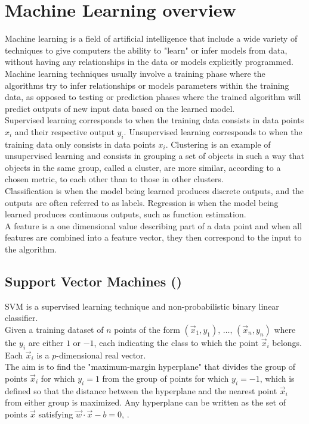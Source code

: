 \documentclass{kththesis}
\begin{document}
\section{Machine Learning overview}
Machine learning is a field of artificial intelligence that include a wide variety of techniques to give computers the ability to "learn" or infer models from data, without having any relationships in the data or models explicitly programmed. Machine learning techniques usually involve a training phase where the algorithms try to infer relationships or models parameters within the training data, as opposed to testing or prediction phases where the trained algorithm will predict outputs of new input data based on the learned model. \\
Supervised learning  corresponds to when the training data consists in data points $x_i$ and their respective output $y_i$. Unsupervised learning corresponds to when the training data only consists in data points $x_i$. Clustering is an example of unsupervised learning and consists in grouping a set of objects in such a way that objects in the same group, called a cluster, are more similar, according to a chosen metric, to each other than to those in other clusters.\\
Classification is when the model being learned produces discrete outputs, and the outputs are often referred to as labels. Regression is when the model being learned produces  continuous outputs, such as function estimation. \\
A feature is a one dimensional value describing part of a data point and when all features are combined into a feature vector, they then correspond to the input to the algorithm. 
\subsection{Support Vector Machines (\textcite{libsvm})} 
SVM is a supervised learning technique and non-probabilistic binary linear classifier. \\
Given a training dataset of $n$ points of the form
$(\vec{x}_{1},y_{1}),\,\ldots ,\,(\vec{x}_{n},y_{n})$ 
where the $y_{i} $ are either $1$ or $-1$, each indicating the class to which the point  $\vec {x}_{i}$ belongs. Each $\vec {x}_{i}$ is a $p$-dimensional real vector. \\
The aim is to find the "maximum-margin hyperplane" that divides the group of points $\vec {x}_{i}$  for which $y_{i}=1$ from the group of points for which $y_{i}=-1$, which is defined so that the distance between the hyperplane and the nearest point $\vec {x}_{i}$ from either group is maximized.
Any hyperplane can be written as the set of points $\vec {x}$ satisfying $\vec {w}\cdot {\vec {x}}-b=0,\,$. \\ 
\end{document}
